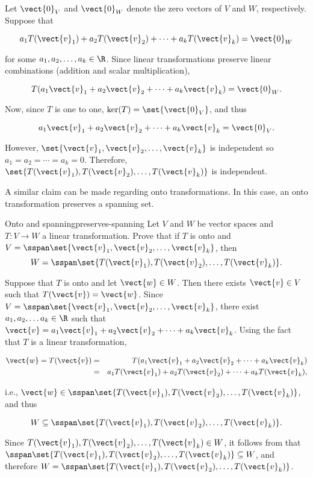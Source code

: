 \begin{solution}
Let $\vect{0}_V$ and $\vect{0}_W$ denote the zero vectors of $V$ and $W$,
respectively.
Suppose that 

\[ a_1T(\vect{v}_1) + a_2T(\vect{v}_2) +\cdots +a_kT(\vect{v}_k) =\vect{0}_W \]

for some $a_1, a_2, \ldots, a_k\in\R$.
Since linear transformations preserve linear combinations (addition
and scalar multiplication),

\[ T(a_1\vect{v}_1 + a_2\vect{v}_2 +\cdots +a_k\vect{v}_k) =\vect{0}_W. \]

Now, since $T$ is one to one, $\ker(T)=\set{\vect{0}_V}$, and thus

\[ a_1\vect{v}_1 + a_2\vect{v}_2 +\cdots +a_k\vect{v}_k =\vect{0}_V. \]

\noindent However, $\set{\vect{v}_1, \vect{v}_2, \ldots, \vect{v}_k}$ is independent so $a_1=a_2=\cdots=a_k=0$.
Therefore, $\set{T(\vect{v}_1), T(\vect{v}_2), \ldots, T(\vect{v}_k)}$
is independent.
\end{solution}

A similar claim can be made regarding onto transformations. In this case, an onto transformation preserves a spanning set.

\begin{example}{Onto and spanning}{preserves-spanning}
Let $V$ and $W$ be vector spaces and $T:V\to W$ a linear
transformation.
Prove that if $T$ is onto and
$V=\sspan\set{\vect{v}_1, \vect{v}_2, \ldots, \vect{v}_k}$,
then
\[ W=\sspan\set{T(\vect{v}_1), T(\vect{v}_2), \ldots, T(\vect{v}_k)}.\]
\end{example}

\begin{solution}
Suppose that $T$ is onto and let $\vect{w}\in W$.  
Then there exists $\vect{v}\in V$ such that $T(\vect{v})=\vect{w}$.
Since $V=\sspan\set{\vect{v}_1, \vect{v}_2, \ldots, \vect{v}_k}$, there
exist $a_1, a_2, \ldots a_k\in\R$ such that 
$\vect{v} = a_1\vect{v}_1 + a_2\vect{v}_2 + \cdots + a_k\vect{v}_k$.
Using the fact that $T$ is a linear transformation,

\begin{eqnarray*}
\vect{w}=T(\vect{v})
& = & T(a_1\vect{v}_1 + a_2\vect{v}_2 + \cdots + a_k\vect{v}_k) \\
& = & a_1T(\vect{v}_1) + a_2T(\vect{v}_2) + \cdots + a_kT(\vect{v}_k),
\end{eqnarray*}

i.e., $\vect{w}\in\sspan\set{T(\vect{v}_1), T(\vect{v}_2), \ldots, T(\vect{v}_k)}$,
and thus 

\[ W\subseteq \sspan\set{T(\vect{v}_1), T(\vect{v}_2), \ldots, T(\vect{v}_k)}.\]

Since $T(\vect{v}_1), T(\vect{v}_2), \ldots, T(\vect{v}_k)\in W$, 
it follows from
that
$\sspan\set{T(\vect{v}_1), T(\vect{v}_2), \ldots, T(\vect{v}_k)}\subseteq W$,
and therefore
$W=\sspan\set{T(\vect{v}_1), T(\vect{v}_2), \ldots, T(\vect{v}_k)}$.
\end{solution}

